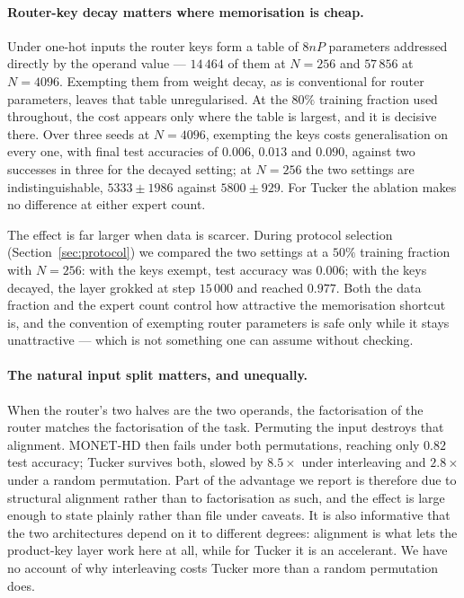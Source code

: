 \paragraph{Router-key decay matters where memorisation is cheap.} Under one-hot
inputs the router keys form a table of $8nP$ parameters addressed directly by the operand value --- $14\,464$ of them at $N = 256$ and $57\,856$ at $N = 4096$.
Exempting them from weight decay, as is conventional for router parameters,
leaves that table unregularised. At the $80\%$ training fraction used throughout, the cost appears only where
the table is largest, and it is decisive there. Over three seeds at
$N = 4096$, exempting the keys costs generalisation on every one, with final
test accuracies of $0.006$, $0.013$ and $0.090$, against two successes in
three for the decayed setting; at $N = 256$ the two settings are
indistinguishable, $5333 \pm 1986$ against $5800 \pm 929$. For Tucker the ablation makes no difference at either expert count.

The effect is far larger when data is scarcer. During protocol selection
(Section~\ref{sec:protocol}) we compared the two settings at a $50\%$ training
fraction with $N = 256$: with the keys exempt, test accuracy was $0.006$; with
the keys decayed, the layer grokked at step $15\,000$ and reached $0.977$.
Both the data fraction and the expert count control how attractive the
memorisation shortcut is, and the convention of exempting router parameters is
safe only while it stays unattractive --- which is not something one can assume
without checking.

\paragraph{The natural input split matters, and unequally.} When the router's
two halves are the two operands, the factorisation of the router matches the
factorisation of the task. Permuting the input destroys that alignment.
MONET-HD then fails under both permutations, reaching only $0.82$ test
accuracy; Tucker survives both, slowed by $8.5\times$ under interleaving and
$2.8\times$ under a random permutation. Part of the advantage we report is
therefore due to structural alignment rather than to factorisation as such, and
the effect is large enough to state plainly rather than file under caveats. It
is also informative that the two architectures depend on it to different
degrees: alignment is what lets the product-key layer work here at all, while
for Tucker it is an accelerant. We have no account of why interleaving costs Tucker more than a random
permutation does.

